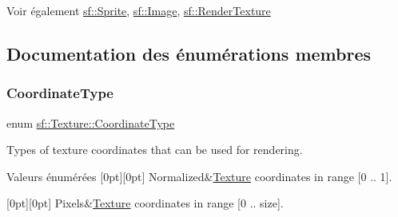 \begin{DoxySeeAlso}{Voir également}
\hyperlink{classsf_1_1Sprite}{sf\+::\+Sprite}, \hyperlink{classsf_1_1Image}{sf\+::\+Image}, \hyperlink{classsf_1_1RenderTexture}{sf\+::\+Render\+Texture} 
\end{DoxySeeAlso}


\subsection{Documentation des énumérations membres}
\mbox{\label{classsf_1_1Texture_aa6fd3bbe3c334b3c4428edfb2765a82e}} 
\subsubsection{\texorpdfstring{Coordinate\+Type}{CoordinateType}}
{\footnotesize\ttfamily enum \hyperlink{classsf_1_1Texture_aa6fd3bbe3c334b3c4428edfb2765a82e}{sf\+::\+Texture\+::\+Coordinate\+Type}}



Types of texture coordinates that can be used for rendering. 

\begin{DoxyEnumFields}{Valeurs énumérées}
[0pt][0pt]{}\mbox{\label{classsf_1_1Texture_aa6fd3bbe3c334b3c4428edfb2765a82ea69d6228950882e4d68be4ba4dbe7df73}} 
Normalized&\hyperlink{classsf_1_1Texture}{Texture} coordinates in range \mbox{[}0 .. 1\mbox{]}. \\
\hline

[0pt][0pt]{}\mbox{\label{classsf_1_1Texture_aa6fd3bbe3c334b3c4428edfb2765a82ea6372f9c3a10203a7a69d8d5da59d82ff}} 
Pixels&\hyperlink{classsf_1_1Texture}{Texture} coordinates in range \mbox{[}0 .. size\mbox{]}. \\
\hline

\end{DoxyEnumFields}


